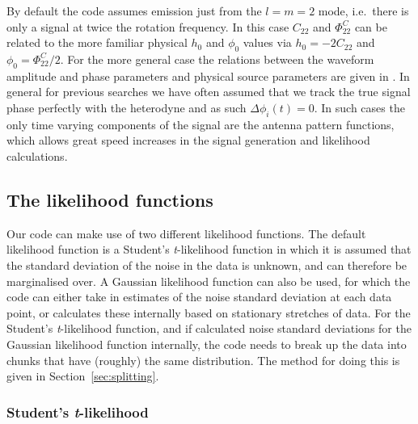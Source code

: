 By default the code assumes emission just from the $l=m=2$ mode, i.e.\ there is only a signal at twice the
rotation frequency. In this case $C_{22}$ and $\Phi_{22}^C$ can be related to the more familiar physical
$h_0$ and $\phi_0$ values via $h_0 = -2C_{22}$ \citep[where the minus sign maintains consistency with the form given in][]{1998PhRvD..58f3001J} and $\phi_0 = \Phi_{22}^C/2$. For the more general case the
relations between the waveform amplitude and phase parameters and physical source parameters are given in
\citet{2015arXiv150105832J}. In general for previous searches we have often assumed that we track the true
signal phase perfectly with the heterodyne and as such $\Delta\phi_i(t) = 0$. In such cases the only time
varying components of the signal are the antenna pattern functions, which allows great speed increases in the
signal generation and likelihood calculations.

\subsection{The likelihood functions}\label{sec:likelihood}

Our code can make use of two different likelihood functions. The default likelihood function is a
Student's {\it t}-likelihood function in which it is assumed that the standard deviation of the noise in the
data is unknown, and can therefore be marginalised over. A Gaussian likelihood function can also be used, for
which the code can either take in estimates of the noise standard deviation at each data point, or calculates
these internally based on stationary stretches of data. For the Student's {\it t}-likelihood function, and if
calculated noise standard deviations for the Gaussian likelihood function internally, the code needs to break
up the data into chunks that have (roughly) the same distribution. The method for doing this is given in
Section~\ref{sec:splitting}.

\subsubsection{Student's {\it t}-likelihood}

